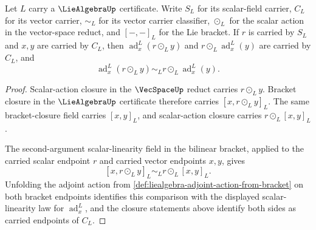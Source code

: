 \begin{theorem}
\label{thm:liealgebra-adjoint-action-scalar-linearity}
Let $L$ carry a $\LieAlgebraUp$ certificate. Write $S_L$ for its scalar-field carrier, $C_L$ for its vector carrier, $\sim_{L}$ for its vector carrier classifier, $\odot_L$ for the scalar action in the vector-space reduct, and $[-,-]_L$ for the Lie bracket. If $r$ is carried by $S_L$ and $x,y$ are carried by $C_L$, then $\operatorname{ad}^{L}_{x}(r\odot_L y)$ and $r\odot_L\operatorname{ad}^{L}_{x}(y)$ are carried by $C_L$, and
$$
\operatorname{ad}^{L}_{x}(r\odot_L y)
\sim_{L}
r\odot_L\operatorname{ad}^{L}_{x}(y).
$$
\end{theorem}
\begin{proof}
Scalar-action closure in the $\VecSpaceUp$ reduct carries $r\odot_L y$. Bracket closure in the $\LieAlgebraUp$ certificate therefore carries $[x,r\odot_L y]_L$. The same bracket-closure field carries $[x,y]_L$, and scalar-action closure carries $r\odot_L[x,y]_L$.

The second-argument scalar-linearity field in the bilinear bracket, applied to the carried scalar endpoint $r$ and carried vector endpoints $x,y$, gives
$$
[x,r\odot_L y]_L
\sim_{L}
r\odot_L[x,y]_L.
$$
Unfolding the adjoint action from \autoref{def:liealgebra-adjoint-action-from-bracket} on both bracket endpoints identifies this comparison with the displayed scalar-linearity law for $\operatorname{ad}^{L}_{x}$, and the closure statements above identify both sides as carried endpoints of $C_L$.
\end{proof}

